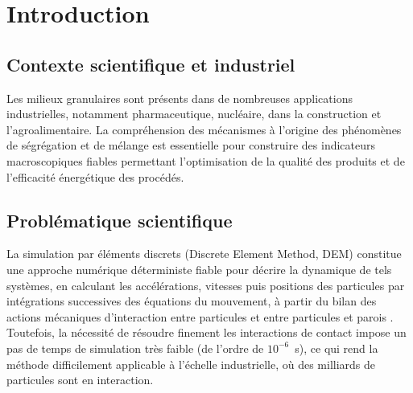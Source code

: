 \documentclass{MemoireMaster}
\begin{document}

\listefiguresdoc
\listetableauxdoc

\debutcorpsmemoire

\section{Introduction}

\subsection{Contexte scientifique et industriel}
Les milieux granulaires sont présents dans de nombreuses applications industrielles, notamment pharmaceutique, nucléaire, dans la construction et l'agroalimentaire. La compréhension des mécanismes à l'origine des phénomènes de ségrégation et de mélange est essentielle pour construire des indicateurs macroscopiques fiables permettant l'optimisation de la qualité des produits et de l'efficacité énergétique des procédés.

\subsection{Problématique scientifique}
La simulation par éléments discrets (Discrete Element Method, DEM) constitue une approche numérique déterministe fiable pour décrire la dynamique de tels systèmes, en calculant les accélérations, vitesses puis positions des particules par intégrations successives des équations du mouvement, à partir du bilan des actions mécaniques d'interaction entre particules et entre particules et parois \cite{tjakra2013}. Toutefois, la nécessité de résoudre finement les interactions de contact impose un pas de temps de simulation très faible (de l'ordre de $10^{-6}$~s), ce qui rend la méthode difficilement applicable à l'échelle industrielle, où des milliards de particules sont en interaction.
\end{document}
